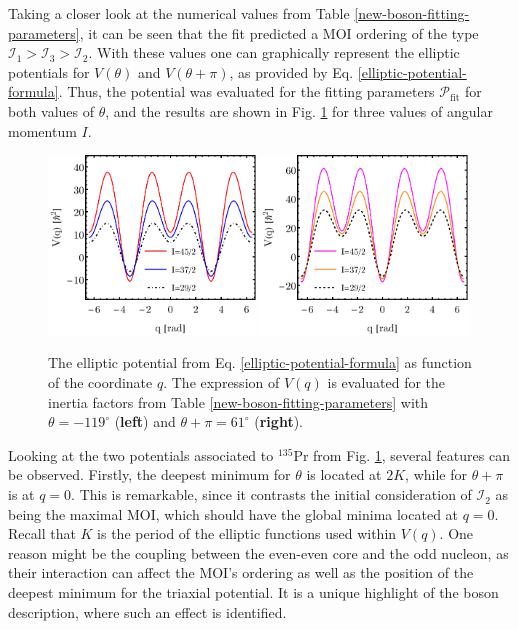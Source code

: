 Taking a closer look at the numerical values from Table \ref{new-boson-fitting-parameters}, it can be seen that the fit predicted a MOI ordering of the type $\mathcal{I}_1>\mathcal{I}_3>\mathcal{I}_2$. With these values one can graphically represent the elliptic potentials for $V(\theta)$ and $V(\theta+\pi)$, as provided by Eq. \ref{elliptic-potential-formula}. Thus, the potential was evaluated for the fitting parameters $\mathcal{P}_\text{fit}$ for both values of $\theta$, and the results are shown in Fig. \ref{elliptic-potential-theta} for three values of angular momentum $I$.
\begin{figure}[b] %
    \centering
    \includegraphics[width=0.49\textwidth]{Chapters/Figures/potential-fit-theta.pdf}
    \includegraphics[width=0.49\textwidth]{Chapters/Figures/potential-fit-theta-pi.pdf}
    \caption{The elliptic potential from Eq. \ref{elliptic-potential-formula} as function of the coordinate $q$. The expression of $V(q)$ is evaluated for the inertia factors from Table \ref{new-boson-fitting-parameters} with $\theta=-119^\circ$ (\textbf{left}) and $\theta+\pi=61^\circ$ (\textbf{right}).}
    \label{elliptic-potential-theta}
\end{figure}

Looking at the two potentials associated to $^{135}$Pr from Fig. \ref{elliptic-potential-theta}, several features can be observed. Firstly, the deepest minimum for $\theta$ is located at $2K$, while for $\theta+\pi$ is at $q=0$. This is remarkable, since it contrasts the initial consideration of $\mathcal{I}_2$ as being the maximal MOI, which should have the global minima located at $q=0$. Recall that $K$ is the period of the elliptic functions used within $V(q)$. One reason might be the coupling between the even-even core and the odd nucleon, as their interaction can affect the MOI's ordering as well as the position of the deepest minimum for the triaxial potential. It is a unique highlight of the boson description, where such an effect is identified.

